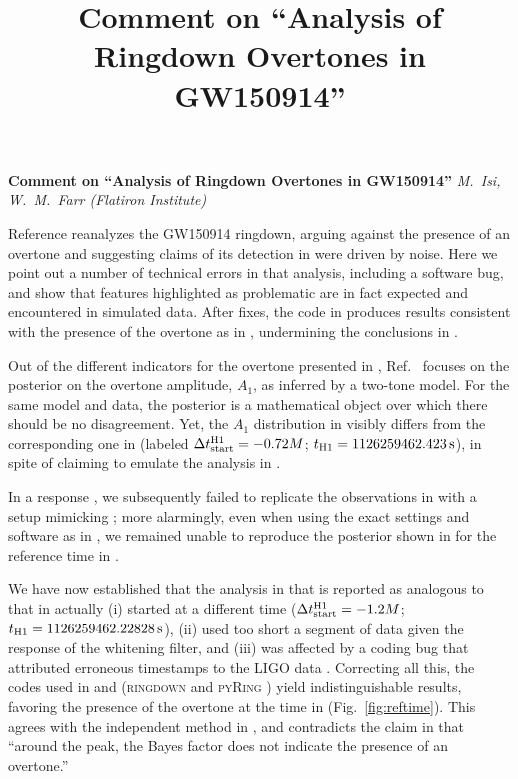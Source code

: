 \documentclass[aps,prd,twocolumn,superscriptaddress,preprintnumbers,floatfix,nofootinbib]{revtex4-2}
\begin{document}
\title{Comment on ``Analysis of Ringdown Overtones in GW150914''}

\textbf{Comment on ``Analysis of Ringdown Overtones in GW150914''}
\emph{M.~Isi, W.~M.~Farr (Flatiron Institute)}

Reference \cite{Cotesta:2022pci} reanalyzes the GW150914 ringdown, arguing against the presence of an overtone and suggesting claims of its detection in \cite{Isi:2019aib} were driven by noise.
Here we point out a number of technical errors in that analysis, including a software bug, and show that features
highlighted as problematic are in fact expected and encountered in simulated data.
After fixes, the code in \cite{Cotesta:2022pci} produces results consistent with the presence of the overtone as in \cite{Isi:2019aib,Isi:2022mhy,Finch:2022ynt}, undermining the conclusions in \cite{Cotesta:2022pci}.

Out of the different indicators for the overtone presented in
\cite{Isi:2019aib}, Ref.~\cite{Cotesta:2022pci} focuses on the posterior on the
overtone amplitude, $A_1$, as inferred by a two-tone model. For the
same model and data, the posterior is a mathematical object over which there
should be no disagreement. Yet, the $A_1$ distribution in \cite{Isi:2019aib}
visibly differs from the corresponding one in \cite{Cotesta:2022pci} (labeled $\Delta
t_{\rm start}^{\rm H1} = -0.72M$; $t_{\rm H1} = 1126259462.423 \, \mathrm{s}$), in
spite of \cite{Cotesta:2022pci} claiming to emulate the analysis in
\cite{Isi:2019aib}.

In a response \cite{Isi:2022mhy}, we subsequently failed to replicate the observations in \cite{Cotesta:2022pci} with a setup mimicking \cite{Isi:2019aib}; more alarmingly, even when using the exact settings and software as in \cite{Cotesta:2022pci}, we remained unable to reproduce the posterior shown in \cite{Cotesta:2022pci} for the reference time in \cite{Isi:2019aib}.

We have now established that the analysis in \cite{Cotesta:2022pci} that is reported as
analogous to that in \cite{Isi:2019aib} actually
(i) started at a different time ($\Delta t_{\rm start}^{\rm H1} = -1.2 M$; $t_{\rm H1} = 1126259462.22828 \, \mathrm{s}$),
(ii) used too short a segment of data given the response of the whitening filter, and
(iii) was affected by a coding bug that attributed erroneous timestamps to the LIGO data \cite{bug}.
Correcting all this, the codes used in
\cite{Isi:2022mhy} and \cite{Cotesta:2022pci} (\textsc{ringdown} \cite{ringdown}
and \textsc{pyRing} \cite{pyRing_soft}) yield indistinguishable
results, favoring the presence of the overtone at the time in \cite{Isi:2019aib}
(Fig.~\ref{fig:reftime}). This agrees with the independent
method in \cite{Finch:2022ynt}, and contradicts the claim in
\cite{Cotesta:2022pci} that ``around the peak, the Bayes factor does not
indicate the presence of an overtone.''
\end{document}
